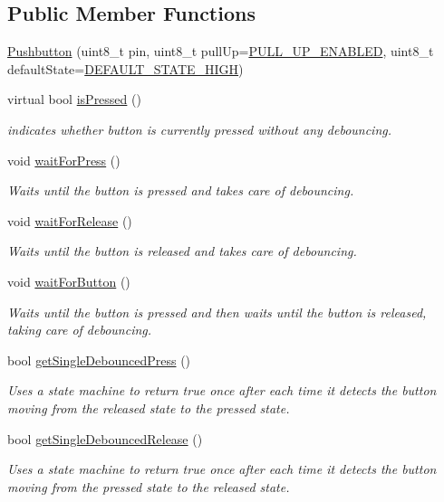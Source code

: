\subsection*{Public Member Functions}
\begin{DoxyCompactItemize}
\item 
\hyperlink{class_pushbutton_a73d08312ffb3502580485d3d2051e19f}{Pushbutton} (uint8\+\_\+t pin, uint8\+\_\+t pull\+Up=\hyperlink{_pushbutton_8h_a2556d56311dd94f5834ef8fb4e6d875d}{P\+U\+L\+L\+\_\+\+U\+P\+\_\+\+E\+N\+A\+B\+L\+ED}, uint8\+\_\+t default\+State=\hyperlink{_pushbutton_8h_ad0c2918a36a770522d44451389d22f34}{D\+E\+F\+A\+U\+L\+T\+\_\+\+S\+T\+A\+T\+E\+\_\+\+H\+I\+GH})
\item 
virtual bool \hyperlink{class_pushbutton_a4990786220489fb5b6cf3af19b601a24}{is\+Pressed} ()
\begin{DoxyCompactList}\small\item\em indicates whether button is currently pressed without any debouncing. \end{DoxyCompactList}\item 
void \hyperlink{class_pushbutton_base_a2e2787595c82ee0913ecf4c1eea4a2c8}{wait\+For\+Press} ()
\begin{DoxyCompactList}\small\item\em Waits until the button is pressed and takes care of debouncing. \end{DoxyCompactList}\item 
void \hyperlink{class_pushbutton_base_ae5fff34b3e1ebd62fd02b99edd6bf13a}{wait\+For\+Release} ()
\begin{DoxyCompactList}\small\item\em Waits until the button is released and takes care of debouncing. \end{DoxyCompactList}\item 
void \hyperlink{class_pushbutton_base_ab755065c930be0649597220316213e8a}{wait\+For\+Button} ()
\begin{DoxyCompactList}\small\item\em Waits until the button is pressed and then waits until the button is released, taking care of debouncing. \end{DoxyCompactList}\item 
bool \hyperlink{class_pushbutton_base_a93953875c8b1c5f69dec3984774de296}{get\+Single\+Debounced\+Press} ()
\begin{DoxyCompactList}\small\item\em Uses a state machine to return true once after each time it detects the button moving from the released state to the pressed state. \end{DoxyCompactList}\item 
bool \hyperlink{class_pushbutton_base_ae568f5db0e8804247e0dcab72a311d42}{get\+Single\+Debounced\+Release} ()
\begin{DoxyCompactList}\small\item\em Uses a state machine to return true once after each time it detects the button moving from the pressed state to the released state. \end{DoxyCompactList}\end{DoxyCompactItemize}


